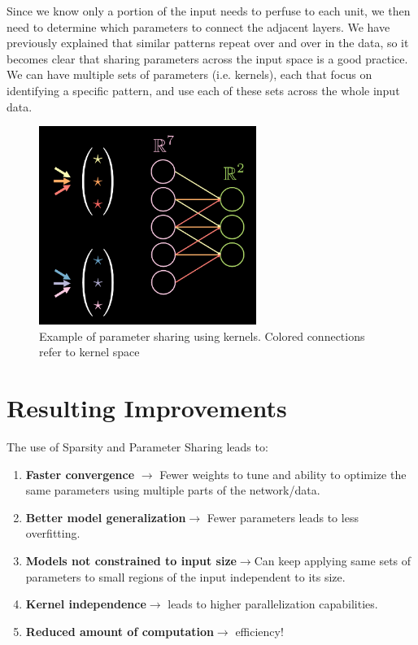 \begin{enumerate}
              Since we know only a portion of the input needs to perfuse to each unit, we then need to determine which parameters to connect the adjacent layers. 
              We have previously explained that similar patterns repeat over and over in the data, so it becomes clear that sharing parameters across the input space is a good practice. 
              We can have multiple sets of parameters (i.e. kernels), each that focus on identifying a specific pattern, and use each of these sets across the whole input data. 
              
            \begin{figure}[H]
            \begin{center}
            \includegraphics[width=200pt]{labs/03/images/kernel.png}
            \end{center}
            \captionsetup{justification=centering, margin=2cm}
            \caption{Example of parameter sharing using kernels. Colored connections refer to kernel space}
            \end{figure}
            
    \end{enumerate}
    
    \section{Resulting Improvements}    
    The use of Sparsity and Parameter Sharing leads to:
    \begin{enumerate}
        \item \textbf{Faster convergence} \(\rightarrow\) Fewer weights to tune and ability to optimize the same parameters using multiple parts of the network/data.
        \item \textbf{Better model generalization}\(\rightarrow\) Fewer parameters leads to less overfitting.
        \item \textbf{Models not constrained to input size}\(\rightarrow\)Can keep applying same sets of parameters to small regions of the input independent to its size.
        \item \textbf{Kernel independence}\(\rightarrow\) leads to higher parallelization capabilities.
        \item \textbf{Reduced amount of computation}\(\rightarrow\) efficiency! 
    \end{enumerate}
    
